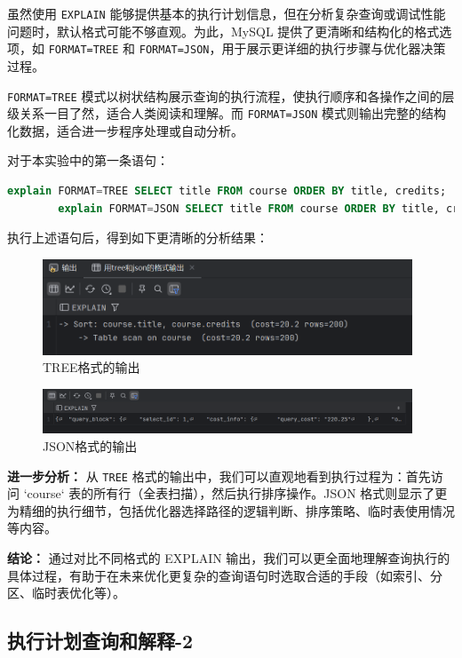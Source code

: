 \documentclass{article}
\begin{document}
	虽然使用 \texttt{EXPLAIN} 能够提供基本的执行计划信息，但在分析复杂查询或调试性能问题时，默认格式可能不够直观。为此，MySQL 提供了更清晰和结构化的格式选项，如 \texttt{FORMAT=TREE} 和 \texttt{FORMAT=JSON}，用于展示更详细的执行步骤与优化器决策过程。
	
	\texttt{FORMAT=TREE} 模式以树状结构展示查询的执行流程，使执行顺序和各操作之间的层级关系一目了然，适合人类阅读和理解。而 \texttt{FORMAT=JSON} 模式则输出完整的结构化数据，适合进一步程序处理或自动分析。
	
	对于本实验中的第一条语句：
	
	\begin{lstlisting}[language=sql, title=更清晰和详细的分析结果, tabsize=4]
		explain FORMAT=TREE SELECT title FROM course ORDER BY title, credits;
		explain FORMAT=JSON SELECT title FROM course ORDER BY title, credits;
	\end{lstlisting}
	
	执行上述语句后，得到如下更清晰的分析结果：
	
	\begin{figure}[H]
		\centering
		\includegraphics[width=11cm]{./images/4.TREE格式的输出.png}
		\caption{TREE格式的输出}
	\end{figure}
	
	\begin{figure}[H]
		\centering
		\includegraphics[width=11cm]{./images/5.JSON格式的输出.png}
		\caption{JSON格式的输出}
	\end{figure}
	
	\textbf{进一步分析：}  
	从 \texttt{TREE} 格式的输出中，我们可以直观地看到执行过程为：首先访问 `course` 表的所有行（全表扫描），然后执行排序操作。JSON 格式则显示了更为精细的执行细节，包括优化器选择路径的逻辑判断、排序策略、临时表使用情况等内容。
	
	\textbf{结论：}  
	通过对比不同格式的 EXPLAIN 输出，我们可以更全面地理解查询执行的具体过程，有助于在未来优化更复杂的查询语句时选取合适的手段（如索引、分区、临时表优化等）。
	
	\subsection{执行计划查询和解释-2}
	
\end{document}
